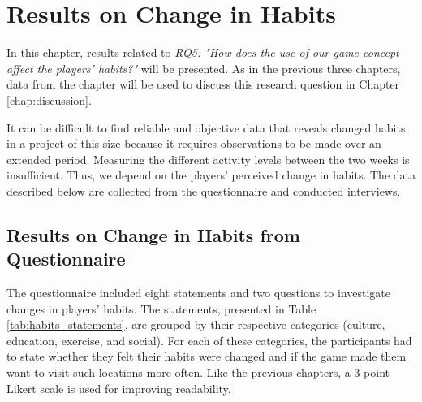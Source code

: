 \section{Results on Change in Habits}
\label{chap:habits}
In this chapter, results related to \textit{RQ5: "How does the use of our game concept affect the players’ habits?"} will be presented. As in the previous three chapters, data from the chapter will be used to discuss this research question in Chapter \ref{chap:discussion}.

It can be difficult to find reliable and objective data that reveals changed habits in a project of this size because it requires observations to be made over an extended period. Measuring the different activity levels between the two weeks is insufficient. Thus, we depend on the players’ perceived change in habits. The data described below are collected from the questionnaire and conducted interviews.

\subsection{Results on Change in Habits from Questionnaire}
The questionnaire included eight statements and two questions to investigate changes in players’ habits. The statements, presented in Table \ref{tab:habits_statements}, are grouped by their respective categories (culture, education, exercise, and social). For each of these categories, the participants had to state whether they felt their habits were changed and if the game made them want to visit such locations more often. Like the previous chapters, a 3-point Likert scale is used for improving readability. 

